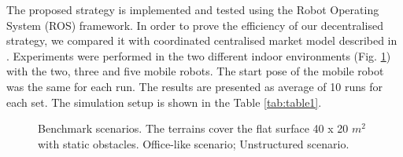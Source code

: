 \documentclass[letterpaper, 10 pt, conference]{ieeeconf}  %
\begin{document}
The proposed strategy is implemented and tested using the Robot Operating System (ROS) framework. In order to prove the efficiency of our decentralised strategy, we compared it with coordinated centralised market model described in \cite{burgard}. Experiments were performed in the two different indoor environments (Fig. \ref{fig:scenarios}) with the two, three and five mobile robots. The start pose of the mobile robot was the same for each run. The results are presented as average of 10 runs for each set. The simulation setup is shown in the Table \ref{tab:table1}.


\begin{figure}[t]
    \setcounter{subfigure}{0}
     \begin{center}
        \hfill
    \end{center}
    \caption{%
       Benchmark scenarios. The terrains cover the flat surface 40 x 20 $m^{2}$ with static obstacles.  Office-like scenario;  Unstructured scenario.
     }%
   \label{fig:scenarios}
\end{figure}
\end{document}
